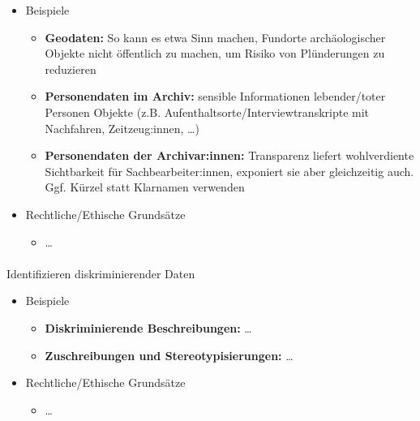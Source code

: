 \documentclass[
  letterpaper,
  DIV=11,
  numbers=noendperiod]{scrartcl}
\makeatletter
\let\oldparagraph\paragraph
\renewcommand{\paragraph}{
    \@ifstar
      \xxxParagraphStar
      \xxxParagraphNoStar
  }
\newcommand{\xxxParagraphStar}[1]{\oldparagraph*{#1}\mbox{}}
\newcommand{\xxxParagraphNoStar}[1]{\oldparagraph{#1}\mbox{}}
\providecommand{\tightlist}{%
  \setlength{\itemsep}{0pt}\setlength{\parskip}{0pt}}\usepackage{longtable,booktabs,array}
\makeatother
\begin{document}
\begin{itemize}
\tightlist
\item
  Beispiele

  \begin{itemize}
  \tightlist
  \item
    \textbf{Geodaten:} So kann es etwa Sinn machen, Fundorte
    archäologischer Objekte nicht öffentlich zu machen, um Risiko von
    Plünderungen zu reduzieren\\
  \item
    \textbf{Personendaten im Archiv:} sensible Informationen
    lebender/toter Personen Objekte (z.B.
    Aufenthaltsorte/Interviewtranskripte mit Nachfahren, Zeitzeug:innen,
    \ldots)
  \item
    \textbf{Personendaten der Archivar:innen:} Transparenz liefert
    wohlverdiente Sichtbarkeit für Sachbearbeiter:innen, exponiert sie
    aber gleichzeitig auch. Ggf. Kürzel statt Klarnamen verwenden
  \end{itemize}
\item
  Rechtliche/Ethische Grundsätze

  \begin{itemize}
  \tightlist
  \item
    \ldots{}
  \end{itemize}
\end{itemize}

\paragraph{Identifizieren diskriminierender
Daten}\label{identifizieren-diskriminierender-daten}

\begin{itemize}
\tightlist
\item
  Beispiele

  \begin{itemize}
  \tightlist
  \item
    \textbf{Diskriminierende Beschreibungen:} \ldots{}
  \item
    \textbf{Zuschreibungen und Stereotypisierungen:} \ldots{}
  \end{itemize}
\item
  Rechtliche/Ethische Grundsätze

  \begin{itemize}
  \tightlist
  \item
    \ldots{}
  \end{itemize}
\end{itemize}
\end{document}
